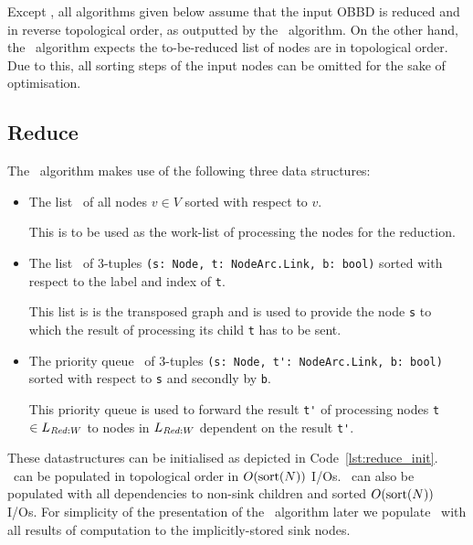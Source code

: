 Except \Reduce, all algorithms given below assume that the input OBBD is reduced
and in reverse topological order, as outputted by the \Reduce\ algorithm. On the
other hand, the \Reduce\ algorithm expects the to-be-reduced list of nodes are
in topological order. Due to this, all sorting steps of the input nodes can
be omitted for the sake of optimisation. \cite{Arge96}

\subsection{Reduce} \label{sec:theory_reduce}
The \Reduce\ algorithm makes use of the following three data structures:

\begin{itemize}
\item The list \ReduceLwork\ of all nodes $v \in V$ sorted with respect to $v$.

  This is to be used as the work-list of processing the nodes for the reduction.

\item The list \ReduceLdep\ of 3-tuples
  \lstinline{(s: Node, t: NodeArc.Link, b: bool)}
  sorted with respect to the label and index of \lstinline{t}.

  This list is is the transposed graph and is used to provide the node
  \lstinline{s} to which the result of processing its child \lstinline{t} has to
  be sent.

\item The priority queue \ReduceQdep\ of 3-tuples
  \lstinline{(s: Node, t': NodeArc.Link, b: bool)} sorted with
  respect to \lstinline{s} and secondly by \lstinline{b}.

  This priority queue is used to forward the result \lstinline{t'} of processing
  nodes \lstinline{t} $\in L_{\mathit{Red:}W}$ to nodes in $L_{\mathit{Red:}W}$ dependent on
  the result \lstinline{t'}.
\end{itemize}
These datastructures can be initialised as depicted in
Code~\ref{lst:reduce_init}. \ReduceLwork\ can be populated in topological
order in $O(\text{sort}(N))$ I/Os. \ReduceLdep\ can also be populated with all
dependencies to non-sink children and sorted $O(\text{sort}(N))$ I/Os. For simplicity
of the presentation of the \Reduce\ algorithm later we populate \ReduceQdep\
with all results of computation to the implicitly-stored sink nodes.

